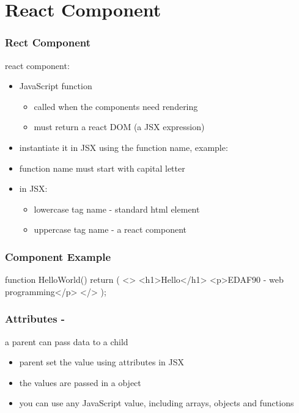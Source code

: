 \section{React Component}
\begin{frame}[fragile] \frametitle{Rect Component}
react component:
\begin{itemize}
  \item JavaScript function
  \begin{itemize}
    \item called when the components need rendering
    \item must return a react DOM (a JSX expression)
  \end{itemize}
  \item instantiate it in JSX using the function name, example: 
  \item function name must start with capital letter
  \item in JSX:
  \begin{itemize}
    \item lowercase tag name - standard html element
    \item uppercase tag name - a react component
  \end{itemize}
\end{itemize}
\end{frame}

\begin{frame}[fragile] \frametitle{Component Example}
\begin{CodeBox}{}
  function HelloWorld(){
    return (
      <>
        <h1>Hello</h1>
        <p>EDAF90 - web programming</p>
      </>
    );
  }
\end{CodeBox}
\end{frame}
\begin{frame}[fragile] \frametitle{Attributes - }
a parent can pass data to a child
\begin{itemize}
  \item parent set the value using attributes in JSX
  \item the values are passed in a  object
  \item you can use any JavaScript value, including arrays, objects and functions
\end{itemize}
\end{frame}

